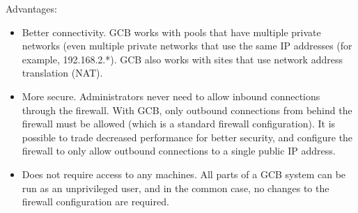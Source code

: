 Advantages:
\begin{itemize}

\item Better connectivity. GCB works with pools that have multiple
  private networks (even multiple private networks that use the same
  IP addresses (for example, 192.168.2.*).
  GCB also works with sites that use network address translation
  (NAT). 

\item More secure. Administrators never need to allow inbound
  connections through the firewall.
  With GCB, only outbound connections from behind the firewall must be
  allowed (which is a standard firewall configuration).
  It is possible to trade decreased performance for better security, and
  configure the firewall to only allow outbound connections to a
  single public IP address.

\item Does not require  access to any machines.
  All parts of a GCB system can be run as an unprivileged user, and in
  the common case, no changes to the firewall configuration are
  required.

\end{itemize}


